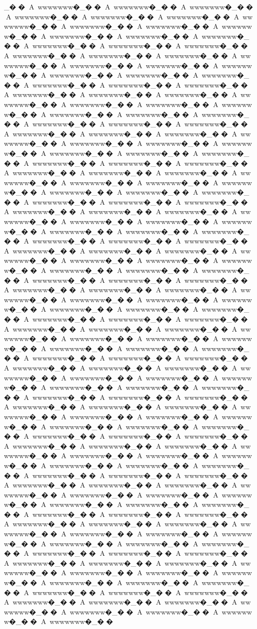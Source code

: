 {{{{{{{{{{{{{{{{{{{{{{{{{{{{{{{{{{{{_��A~wwwwwww�_��A~wwwwwww�_��A~wwwwwww�_��A~wwwwwww�_��A~wwwwwww�_��A~wwwwwww�_��A~wwwwwww�_��A~wwwwwww�_��A~wwwwwww�_��A~wwwwwww�_��A~wwwwwww�_��A~wwwwwww�_��A~wwwwwww�_��A~wwwwwww�_��A~wwwwwww�_��A~wwwwwww�_��A~wwwwwww�_��A~wwwwwww�_��A~wwwwwww�_��A~wwwwwww�_��A~wwwwwww�_��A~wwwwwww�_��A~wwwwwww�_��A~wwwwwww�_��A~wwwwwww�_��A~wwwwwww�_��A~wwwwwww�_��A~wwwwwww�_��A~wwwwwww�_��A~wwwwwww�_��A~wwwwwww�_��A~wwwwwww�_��A~wwwwwww�_��A~wwwwwww�_��A~wwwwwww�_��A~wwwwwww�_��A~wwwwwww�_��A~wwwwwww�_��A~wwwwwww�_��A~wwwwwww�_��A~wwwwwww�_��A~wwwwwww�_��A~wwwwwww�_��A~wwwwwww�_��A~wwwwwww�_��A~wwwwwww�_��A~wwwwwww�_��A~wwwwwww�_��A~wwwwwww�_��A~wwwwwww�_��A~wwwwwww�_��A~wwwwwww�_��A~wwwwwww�_��A~wwwwwww�_��A~wwwwwww�_��A~wwwwwww�_��A~wwwwwww�_��A~wwwwwww�_��A~wwwwwww�_��A~wwwwwww�_��A~wwwwwww�_��A~wwwwwww�_��A~wwwwwww�_��A~wwwwwww�_��A~wwwwwww�_��A~wwwwwww�_��A~wwwwwww�_��A~wwwwwww�_��A~wwwwwww�_��A~wwwwwww�_��A~wwwwwww�_��A~wwwwwww�_��A~wwwwwww�_��A~wwwwwww�_��A~wwwwwww�_��A~wwwwwww�_��A~wwwwwww�_��A~wwwwwww�_��A~wwwwwww�_��A~wwwwwww�_��A~wwwwwww�_��A~wwwwwww�_��A~wwwwwww�_��A~wwwwwww�_��A~wwwwwww�_��A~wwwwwww�_��A~wwwwwww�_��A~wwwwwww�_��A~wwwwwww�_��A~wwwwwww�_��A~wwwwwww�_��A~wwwwwww�_��A~wwwwwww�_��A~wwwwwww�_��A~wwwwwww�_��A~wwwwwww�_��A~wwwwwww�_��A~wwwwwww�_��A~wwwwwww�_��A~wwwwwww�_��A~wwwwwww�_��A~wwwwwww�_��A~wwwwwww�_��A~wwwwwww�_��A~wwwwwww�_��A~wwwwwww�_��A~wwwwwww�_��A~wwwwwww�_��A~wwwwwww�_��A~wwwwwww�_��A~wwwwwww�_��A~wwwwwww�_��A~wwwwwww�_��A~wwwwwww�_��A~wwwwwww�_��A~wwwwwww�_��A~wwwwwww�_��A~wwwwwww�_��A~wwwwwww�_��A~wwwwwww�_��A~wwwwwww�_��A~wwwwwww�_��A~wwwwwww�_��A~wwwwwww�_��A~wwwwwww�_��A~wwwwwww�_��A~wwwwwww�_��A~wwwwwww�_��A~wwwwwww�_��A~wwwwwww�_��A~wwwwwww�_��A~wwwwwww�_��A~wwwwwww�_��A~wwwwwww�_��A~wwwwwww�_��A~wwwwwww�_��A~wwwwwww�_��A~wwwwwww�_��A~wwwwwww�_��A~wwwwwww�_��A~wwwwwww�_��A~wwwwwww�_��A~wwwwwww�_��A~wwwwwww�_��A~wwwwwww�_��A~wwwwwww�_��A~wwwwwww�_��A~wwwwwww�_��A~wwwwwww�_��A~wwwwwww�_��A~wwwwwww�_��A~wwwwwww�_��A~wwwwwww�_��A~wwwwwww�_��A~wwwwwww�_��A~wwwwwww�_��A~wwwwwww�_��A~wwwwwww�_��A~wwwwwww�_��A~wwwwwww�_��A~wwwwwww�_��A~wwwwwww�_��A~wwwwwww�_��A~wwwwwww�_��A~wwwwwww�_��A~wwwwwww�_��A~wwwwwww�_��A~wwwwwww�_��A~wwwwwww�_��A~wwwwwww�_��A~wwwwwww�_��A~wwwwwww�_��A~wwwwwww�_��A~wwwwwww�_��A~wwwwwww�_��A~wwwwwww�_��A~wwwwwww�_��A~wwwwwww�_��A~wwwwwww�_��A~wwwwwww�_��A~wwwwwww�_��A~wwwwwww�_��A~wwwwwww�_��A~wwwwwww�_��A~wwwwwww�_��A~wwwwwww�_��A~wwwwwww�_��A~wwwwwww�_��A~wwwwwww�_��A~wwwwwww�_��A~wwwwwww�_��A~wwwwwww�_��A~wwwwwww�_��A~wwwwwww�_��A~wwwwwww�_��A~wwwwwww�_��A~wwwwwww�_��A~wwwwwww�_��A~wwwwwww�_��A~wwwwwww�_��A~wwwwwww�_��A~wwwwwww�_��A~wwwwwww�_��A~wwwwwww�_��A~wwwwwww�_��A~wwwwwww�_��}}}}}}}}}}}}}}}}}}}}}}}}}}}}}}}}}}}}
